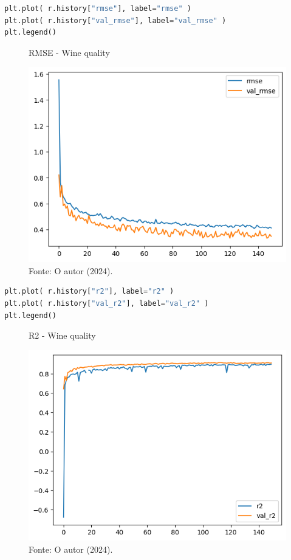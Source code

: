 \begin{lstlisting}[language=Python, style=input]
plt.plot( r.history["rmse"], label="rmse" )
plt.plot( r.history["val_rmse"], label="val_rmse" )
plt.legend()
\end{lstlisting}
\begin{figure}[H]
\centering
\caption{RMSE - Wine quality}
\includegraphics[width=.8\linewidth]{apendices/fig/13_IAA012_7.png}
\caption*{Fonte: O autor (2024).}
\end{figure}

\begin{lstlisting}[language=Python, style=input]
plt.plot( r.history["r2"], label="r2" )
plt.plot( r.history["val_r2"], label="val_r2" )
plt.legend()
\end{lstlisting}
\begin{figure}[H]
\centering
\caption{R2 - Wine quality}
\includegraphics[width=.8\linewidth]{apendices/fig/13_IAA012_8.png}
\caption*{Fonte: O autor (2024).}
\end{figure}
